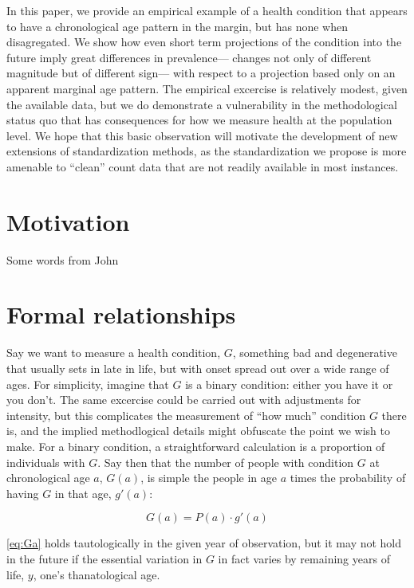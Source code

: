 \documentclass[11pt,oneside,a4paper]{article} %
\begin{document}
In this paper, we provide an empirical example of a health condition that
appears to have a chronological age pattern in the margin, but has none when
disagregated. We show how even short term projections of the
condition into the future imply great differences in prevalence--- changes not only of different magnitude but
of different sign--- with respect to a projection based only on an
apparent marginal age pattern. The empirical excercise is relatively modest,
given the available data, but we do demonstrate a vulnerability in the
methodological status quo that has consequences for how we measure health at the
population level. We hope that this basic observation will motivate the
development of new extensions of standardization methods, as the standardization
we propose is more amenable to ``clean'' count data that are not readily
available in most instances.

\section*{Motivation}
Some words from John

\section*{Formal relationships}
Say we want to measure a health condition, $G$, something bad and degenerative
that usually sets in late in life, but with onset spread out over a wide range
of ages. For simplicity, imagine that $G$ is a binary condition: either you have
it or you don't. The same excercise could be carried out with adjustments for
intensity, but this complicates the measurement of ``how much'' condition $G$
there is, and the implied methodlogical details might obfuscate the point we
wish to make. For a binary condition, a straightforward calculation is a
proportion of individuals with $G$. Say then that the number of people
with condition $G$ at chronological age $a$, $G(a)$, is simple the people in age
$a$ times the probability of having $G$ in that age, $g'(a)$:

\begin{equation}
\label{eq:Ga}
G(a) = P(a) \cdot g'(a)
\end{equation}

\eqref{eq:Ga} holds tautologically in the given year of observation, but it may
not hold in the future if the essential variation in $G$ in fact varies by
remaining years of life, $y$, one's thanatological age.
\end{document}
